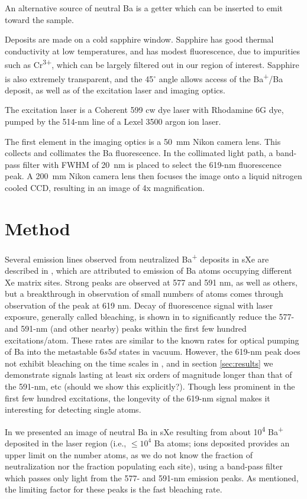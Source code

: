 \documentclass[aps,pra,reprint,superscriptaddress]{revtex4-1}
\begin{document}
An alternative source of neutral Ba is a getter which can be inserted to emit toward the sample.

Deposits are made on a cold sapphire window.  Sapphire has good thermal conductivity at low temperatures, and has modest fluorescence, due to impurities such as Cr\textsuperscript{3+}, which can be largely filtered out in our region of interest.  Sapphire is also extremely transparent, and the 45$^{\circ}$ angle allows access of the Ba\textsuperscript{+}/Ba deposit, as well as of the excitation laser and imaging optics.  

The excitation laser is a Coherent 599 cw dye laser with Rhodamine 6G dye, pumped by the 514-nm line of a Lexel 3500 argon ion laser.  

The first element in the imaging optics is a 50~mm Nikon camera lens.  This collects and collimates the Ba fluorescence.  In the collimated light path, a band-pass filter with FWHM of 20~nm is placed to select the 619-nm fluorescence peak.  A 200~mm Nikon camera lens then focuses the image onto a liquid nitrogen cooled CCD, resulting in an image of 4x magnification.

\section{Method}

Several emission lines observed from neutralized Ba\textsuperscript{+} deposits in sXe are described in \cite{Mong2015}, which are attributed to emission of Ba atoms occupying different Xe matrix sites.  Strong peaks are observed at 577 and 591 nm, as well as others, but a breakthrough in observation of small numbers of atoms comes through observation of the peak at 619 nm.  Decay of fluorescence signal with laser exposure, generally called bleaching, is shown in \cite{Mong2015} to significantly reduce the 577- and 591-nm (and other nearby) peaks within the first few hundred excitations/atom.  These rates are similar to the known rates for optical pumping of Ba into the metastable $6s5d$ states in vacuum.  However, the 619-nm peak does not exhibit bleaching on the time scales in \cite{Mong2015}, and in section \ref{sec:results} we demonstrate signals lasting at least six orders of magnitude longer than that of the 591-nm, etc {\color{red}(should we show this explicitly?)}.  Though less prominent in the first few hundred excitations, the longevity of the 619-nm signal makes it interesting for detecting single atoms.

In \cite{Mong2015} we presented an image of neutral Ba in sXe resulting from about 10\textsuperscript{4} Ba\textsuperscript{+} deposited in the laser region (i.e., $\leq 10^4$ Ba atoms; ions deposited provides an upper limit on the number atoms, as we do not know the fraction of neutralization nor the fraction populating each site), using a band-pass filter which passes only light from the 577- and 591-nm emission peaks.  As mentioned, the limiting factor for these peaks is the fast bleaching rate.
\end{document}
